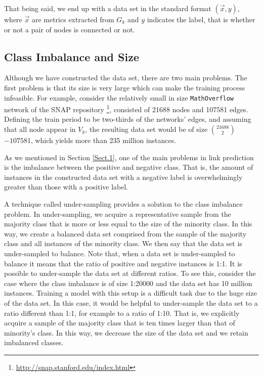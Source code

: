 \documentclass{acm_proc_article-sp}
\begin{document}
That being said, we end up with a data set in the standard format $(\vec{x},y)$, where $\vec{x}$ are metrics extracted from $G_k$ and $y$ indicates the label, that is whether or not a pair of nodes is connected or not. 

\subsection{Class Imbalance and Size}
\label{Sect.2b}
Although we have constructed the data set, there are two main problems. The first problem is that its size is very large which can make the training process infeasible. For example, consider the relatively small in size \texttt{MathOverflow} network \cite{Paranjape:2017:MTN:3018661.3018731} of the SNAP repository \footnote{\url{http://snap.stanford.edu/index.html}}, consisted of 21688 nodes and 107581 edges. Defining the train period to be two-thirds of the networks' edges, and assuming that all node appear in $V_k$, the resulting data set would be of size $21688 \choose 2$ $ - 107581$, which yields more than 235 million instances.

As we mentioned in Section \ref{Sect.1}, one of the main problems in link prediction is the imbalance between the positive and negative class. That is, the amount of instances in the constructed data set with a negative label is overwhelmingly greater than those with a positive label. 

A technique called under-sampling provides a solution to the class imbalance problem. In under-sampling, we acquire a representative sample from the majority class that is more or less equal to the size of the minority class. In this way, we create a balanced data set comprised from the sample of the majority class and all instances of the minority class. We then say that the data set is under-sampled to balance. Note that, when a data set is under-sampled to balance it means that the ratio of positive and negative instances is 1:1. It is possible to under-sample the data set at different ratios. To see this, consider the case where the class imbalance is of size 1:20000 and the data set has 10 million instances. Training a model with this setup is a difficult task due to the huge size of the data set. In this case, it would be helpful to under-sample the data set to a ratio different than 1:1, for example to a ratio of 1:10. That is, we explicitly acquire a sample of the majority class that is ten times larger than that of minority's class. In this way, we decrease the size of the data set and we retain imbalanced classes.
\end{document}
